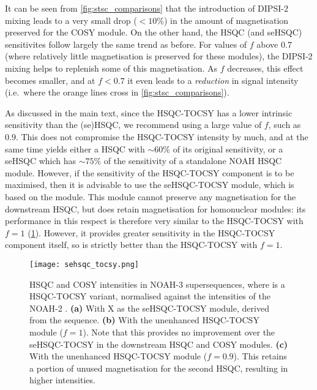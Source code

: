 It can be seen from \cref{fig:stsc_comparisons} that the introduction of DIPSI-2 mixing leads to a very small drop ($< 10\%$) in the amount of  magnetisation preserved for the COSY module.
On the other hand, the HSQC (and seHSQC) sensitivites follow largely the same trend as before.
For values of $f$ above $0.7$ (where relatively little  magnetisation is preserved for these modules), the DIPSI-2 mixing helps to replenish some of this magnetisation.
As $f$ decreases, this effect becomes smaller, and at $f < 0.7$ it even leads to a \textit{reduction} in signal intensity (i.e.\ where the orange lines cross in \cref{fig:stsc_comparisons}).

As discussed in the main text, since the HSQC-TOCSY has a lower intrinsic sensitivity than the (se)HSQC, we recommend using a large value of $f$, such as $0.9$.
This does not compromise the HSQC-TOCSY intensity by much, and at the same time yields either a HSQC with $\sim 60\%$ of its original sensitivity, or a seHSQC which has $\sim 75\%$ of the sensitivity of a standalone NOAH HSQC module.
However, if the sensitivity of the HSQC-TOCSY component is to be maximised, then it is advisable to use the seHSQC-TOCSY module, which is based on the \noahSpb{} module.\autocite{Hansen2021AC}
This module cannot preserve any  magnetisation for the downstream HSQC, but does retain  magnetisation for homonuclear modules: its performance in this respect is therefore very similar to the HSQC-TOCSY with $f = 1$ (\cref{fig:sehsqc_tocsy}).
However, it provides greater sensitivity in the HSQC-TOCSY component itself, so is strictly better than the HSQC-TOCSY with $f = 1$.

\begin{figure}
    \centering
    \texttt{[image: sehsqc\_tocsy.png]}
    \caption{
        HSQC and COSY intensities in NOAH-3  supersequences, where \noahX{} is a HSQC-TOCSY variant, normalised against the intensities of the NOAH-2 .
        \textbf{(a)} With X as the seHSQC-TOCSY module, derived from the \noahSpb{} sequence.
        \textbf{(b)} With the unenhanced HSQC-TOCSY module ($f = 1$). Note that this provides no improvement over the seHSQC-TOCSY in the downstream HSQC and COSY modules.
        \textbf{(c)} With the unenhanced HSQC-TOCSY module ($f = 0.9$). This retains a portion of unused  magnetisation for the second HSQC, resulting in higher intensities.
        \andro{}
    }
    \label{fig:sehsqc_tocsy}
\end{figure}

